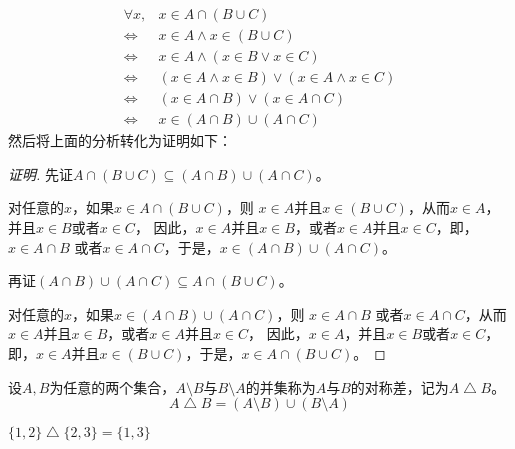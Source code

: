   \begin{equation*}
    \begin{split}
      \forall x, &x \in A \cap (B \cup C) \\
      \Leftrightarrow& x \in A \land x \in (B \cup C)\\
      \Leftrightarrow& x \in A \land (x \in B \lor x \in C)\\
      \Leftrightarrow& (x \in A \land x \in B) \lor (x \in A \land x \in C)\\
      \Leftrightarrow& (x \in A \cap B) \lor (x \in A \cap C)\\
      \Leftrightarrow& x \in (A \cap B) \cup (A \cap C)
    \end{split}
  \end{equation*}
  然后将上面的分析转化为证明如下：  
\begin{proof}[证明]
  先证$A \cap (B \cup C) \subseteq (A \cap B) \cup (A \cap C)$。

  对任意的$x$，如果$x \in A \cap (B \cup C)$，则 $x \in A$并且$x \in (B \cup C)$，从而$x \in A$，并且$x \in B$或者$ x \in C$，
  因此，$x \in A$并且$x \in B$，或者$x \in A$并且$ x \in C$，即，$x \in A \cap B$ 或者$x \in A \cap C$，于是，$x \in (A \cap B) \cup (A \cap C)$。

  再证$(A \cap B) \cup (A \cap C) \subseteq A \cap (B \cup C)$。

    对任意的$x$，如果$x \in (A \cap B) \cup (A \cap C)$，则 $x \in A \cap B$ 或者$x \in A \cap C$，从而$x \in A$并且$x \in B$，或者$x \in A$并且$ x \in C$，
  因此，$x \in A$，并且$x \in B$或者$ x \in C$，即，$x \in A$并且$x \in (B \cup C)$，于是，$x \in A \cap (B \cup C)$。

\end{proof}
{\flushleft
\begin{minipage}{0.69\linewidth}
  \begin{Def}
    设$A,B$为任意的两个集合，$A\setminus B$与$B\setminus A$的并集称为$A$与$B$的对称差，记为$A \bigtriangleup B$。
    \begin{equation*}
      A\bigtriangleup B = (A \setminus B) \cup (B \setminus A)
    \end{equation*}
  \end{Def}
\end{minipage}
\begin{minipage}{0.29\linewidth}
  \end{minipage}}
    \begin{Example}
        $\{1,2\} \bigtriangleup \{2,3\} = \{1,3\}$
      \end{Example}

